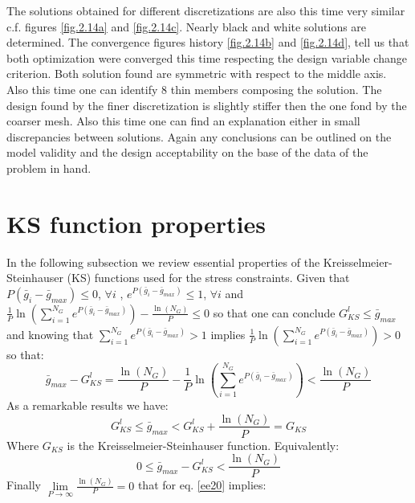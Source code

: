      The solutions obtained for different discretizations are also this time very similar c.f. figures \ref{fig.2.14a} and \ref{fig.2.14c}. Nearly black and white solutions are determined. The convergence figures history \ref{fig.2.14b} and \ref{fig.2.14d}, tell us that both optimization were converged this time respecting the design variable change criterion. Both solution found are symmetric with respect to the middle axis. Also this time one can identify 8 thin members composing the solution. The design found by the finer discretization is slightly stiffer then the one fond by the coarser mesh. Also this time one can find an explanation either in small discrepancies between solutions. Again any conclusions can be outlined on the model validity and the design acceptability on the base of the data of the problem in hand.
     \clearpage
\section{KS function properties}
\label{Appendix1}
In the following subsection we review essential properties of the Kreisselmeier-Steinhauser (KS) functions used for the stress constraints.
Given that $P\left(\bar{g}_i-\bar{g}_{max}\right)\leq 0$, $\forall i$ , $e^{P\left(\bar{g}_i-\bar{g}_{max}\right)}\leq 1$, $\forall i$ and $\frac{1}{P}\ln\left(\sum_{i=1}^{N_G}e^{P\left(\bar{g}_i-\bar{g}_{max}\right)}\right)-\frac{\ln\left(N_G\right)}{P}\leq 0$ so that one can conclude $G^{l}_{KS}\leq \bar{g}_{max}$ and knowing that  $\sum_{i=1}^{N_G}e^{P\left(\bar{g}_i-\bar{g}_{max}\right)}>1$ implies $\frac{1}{P}\ln\left(\sum_{i=1}^{N_G}e^{P\left(\bar{g}_i-\bar{g}_{max}\right)}\right)>0$ so that:
\begin{equation}
\label{eq.NGP}
\bar{g}_{max}-G^{l}_{KS}=\frac{\ln\left(N_G\right)}{P}-\frac{1}{P}\ln\left(\sum_{i=1}^{N_G}e^{P\left(\bar{g}_i-\bar{g}_{max}\right)}\right)< \frac{\ln\left(N_G\right)}{P}
\end{equation}
As a remarkable results we have:
 \begin{equation}
 G^{l}_{KS}\leq\bar{g}_{max}<G^{l}_{KS}+\frac{\ln\left(N_G\right)}{P}=G_{KS}
 \end{equation}
 Where $G_{KS}$ is the Kreisselmeier-Steinhauser function.
Equivalently:
  \begin{equation}
  \label{ee20}
  0\leq\bar{g}_{max}-G^{l}_{KS}<\frac{\ln\left(N_G\right)}{P}
  \end{equation} 
Finally $\lim\limits_{P\rightarrow \infty}\frac{\ln\left(N_G\right)}{P}=0$
that for eq. \ref{ee20} implies:
